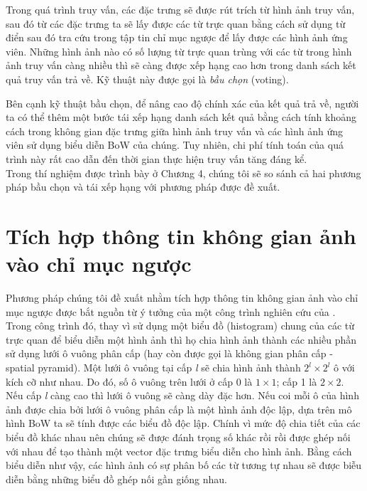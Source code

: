 Trong quá trình truy vấn, các đặc trưng sẽ được rút trích từ hình ảnh truy vấn, sau đó từ các đặc trưng ta sẽ lấy được các từ trực quan bằng cách sử dụng từ điển sau đó tra cứu trong tập tin chỉ mục ngược để lấy được các hình ảnh ứng viên. Những hình ảnh nào có số lượng từ trực quan trùng với các từ trong hình ảnh truy vấn càng nhiều thì sẽ càng được xếp hạng cao hơn trong danh sách kết quả truy vấn trả về. Kỹ thuật này được gọi là \textit{bầu chọn} (voting).

Bên cạnh kỹ thuật bầu chọn, để nâng cao độ chính xác của kết quả trả về, người ta có thể thêm một bước tái xếp hạng danh sách kết quả bằng cách tính khoảng cách trong không gian đặc trưng giữa hình ảnh truy vấn và các hình ảnh ứng viên sử dụng biểu diễn BoW của chúng. Tuy nhiên, chi phí tính toán của quá trình này rất cao dẫn đến thời gian thực hiện truy vấn tăng đáng kể.\\

Trong thí nghiệm được trình bày ở Chương 4, chúng tôi sẽ so sánh cả hai phương pháp bầu chọn và tái xếp hạng với phương pháp được đề xuất.\\

\section{Tích hợp thông tin không gian ảnh vào chỉ mục ngược}
Phương pháp chúng tôi đề xuất nhằm tích hợp thông tin không gian ảnh vào chỉ mục ngược được bắt nguồn từ ý tưởng của một công trình nghiên cứu của \cite{lazebnik2006beyond}. Trong công trình đó, thay vì sử dụng một biểu đồ (histogram) chung  của các từ trực quan để biểu diễn một hình ảnh thì họ chia hình ảnh thành các nhiều phần sử dụng lưới ô vuông phân cấp (hay còn được gọi là không gian phân cấp - spatial pyramid). Một lưới ô vuông tại cấp \textit{l} sẽ chia hình ảnh thành $2^l \times 2^l$ ô với kích cỡ như nhau. Do đó, số ô vuông trên lưới ở cấp 0 là $1 \times 1$; cấp 1 là $2 \times 2$. Nếu cấp \textit{l} càng cao thì lưới ô vuông sẽ càng dày đặc hơn. Nếu coi mỗi ô của hình ảnh được chia bởi lưới ô vuông phân cấp là một hình ảnh độc lập, dựa trên mô hình BoW ta sẽ tính được các biểu đồ độc lập. Chính vì mức độ chia tiết của các biểu đồ khác nhau nên chúng sẽ được đánh trọng số khác rồi rồi được ghép nối với nhau để tạo thành một vector đặc trưng biểu diễn cho hình ảnh. Bằng cách biểu diễn như vậy, các hình ảnh có sự phân bố các từ tương tự nhau sẽ được biễu diễn bằng những biểu đồ ghép nối gần giống nhau.

